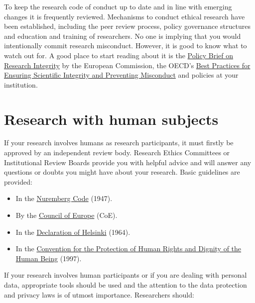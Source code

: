 \documentclass[
]{book}
\begin{document}
To keep the research code of conduct up to date and in line with emerging changes it is frequently reviewed. Mechanisms to conduct ethical research have been established, including the peer review process, policy governance structures and education and training of researchers. No one is implying that you would intentionally commit research misconduct. However, it is good to know what to watch out for. A good place to start reading about it is the \href{https://ec.europa.eu/research/participants/documents/downloadPublic?documentIds=080166e5bf5c08aa\&appId=PPGMS}{Policy Brief on Research Integrity} by the European Commission, the OECD's \href{https://www.oecd.org/science/inno/40188303.pdf}{Best Practices for Ensuring Scientific Integrity and Preventing Misconduct} and policies at your institution.

\hypertarget{research-with-human-subjects}{%
\section{Research with human subjects}\label{research-with-human-subjects}}

If your research involves humans as research participants, it must firstly be approved by an independent review body. Research Ethics Committees or Institutional Review Boards provide you with helpful advice and will answer any questions or doubts you might have about your research. Basic guidelines are provided:

\begin{itemize}
\item
  In the \href{https://en.wikipedia.org/wiki/Nuremberg_Code}{Nuremberg Code} (1947).
\item
  By the \href{https://www.coe.int/en/web/portal}{Council of Europe} (CoE).
\item
  In the \href{https://www.wma.net/policies-post/wma-declaration-of-helsinki-ethical-principles-for-medical-research-involving-human-subjects/\#:~:text=1.,identifiable\%20human\%20material\%20and\%20data.}{Declaration of Helsinki} (1964).
\item
  In the \href{https://docs.google.com/document/u/0/d/1oUTVCqSzDajLWZAlSkFwHX8XZrolNDDayX1I3OtkzRs/edit}{Convention for the Protection of Human Rights and Dignity of the Human Being} (1997).
\end{itemize}

If your research involves human participants or if you are dealing with personal data, appropriate tools should be used and the attention to the data protection and privacy laws is of utmost importance. Researchers should:
\end{document}
